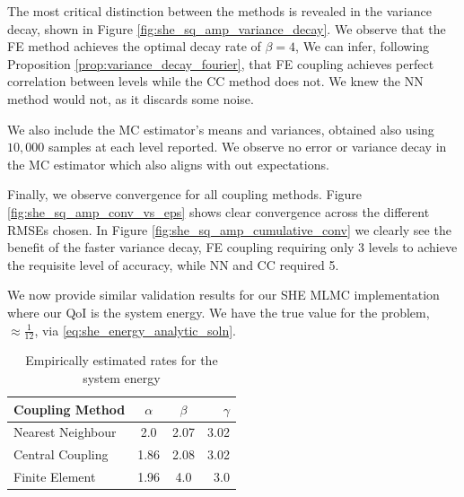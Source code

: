 The most critical distinction between the methods is revealed in the variance decay,
shown in Figure \ref{fig:she_sq_amp_variance_decay}. We observe that the FE method
achieves the optimal decay rate of $\beta = 4$, 
We can infer, following 
Proposition \ref{prop:variance_decay_fourier}, that FE coupling achieves 
perfect correlation between levels while the CC method does not. We knew the 
NN method would not, as it discards some noise.

We also include the MC estimator's means and variances, obtained also using $10,000$ samples
at each level reported. We observe no error or variance decay in the MC estimator which 
also aligns with out expectations.

Finally, we observe convergence for all coupling methods. 
Figure \ref{fig:she_sq_amp_conv_vs_eps} shows clear convergence across the different RMSEs chosen. 
In Figure \ref{fig:she_sq_amp_cumulative_conv} we clearly see the benefit of the faster variance decay,
FE coupling requiring only 3 levels to achieve the requisite level of accuracy, while NN and CC 
required 5.


We now provide similar validation results for our SHE MLMC implementation where our QoI is the system energy. 
We have the true value for the problem, $\approx \frac{1}{12}$, via
\ref{eq:she_energy_analytic_soln}.

\begin{table}[htbp]
    \centering
    \begin{tabular}{|l|c|c|r|}
        \hline
        \textbf{Coupling Method} & \textbf{$\alpha$} & \textbf{$\beta$} & \textbf{$\gamma$} \\
        \hline
        Nearest Neighbour & 2.0 & 2.07 & 3.02\\
        Central Coupling & 1.86 & 2.08 & 3.02 \\
        Finite Element & 1.96 & 4.0 & 3.0 \\
        \hline
    \end{tabular}
    \caption{Empirically estimated rates for the system energy}
    \label{tab:energy_decay_rates}
\end{table}

